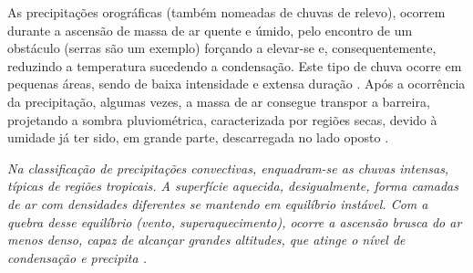 As precipitações orográficas (também nomeadas de chuvas de relevo), ocorrem durante a ascensão de massa de ar quente e úmido, pelo encontro de um obstáculo (serras são um exemplo) forçando a elevar-se e, consequentemente, reduzindo a temperatura sucedendo a condensação. Este tipo de chuva ocorre em pequenas áreas, sendo de baixa intensidade e extensa duração \cite{ciclo-hidrologico}. Após a ocorrência da precipitação, algumas vezes, a massa de ar consegue transpor a barreira, projetando a sombra pluviométrica, caracterizada por regiões secas, devido à umidade já ter sido, em grande parte, descarregada no lado oposto \cite{chuva-orografica}.

\textit{Na classificação de precipitações convectivas, enquadram-se as chuvas intensas, típicas de regiões tropicais. A superfície aquecida, desigualmente, forma camadas de ar com densidades diferentes se mantendo em equilíbrio instável. Com a quebra desse equilíbrio (vento, superaquecimento), ocorre a ascensão brusca do ar menos denso, capaz de alcançar grandes altitudes, que atinge o nível de condensação e precipita \cite{hidro-aplicada}.}